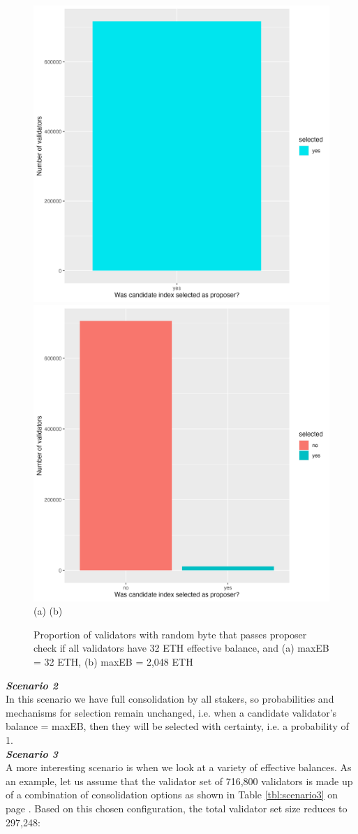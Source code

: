 \begin{figure}[htbp]
\begin{center}
\includegraphics[width=0.45\linewidth]{images/current-solo-barchart}
\includegraphics[width=0.45\linewidth]{images/maxeb-solo-barchart} \\
(a) \hspace{180pt}     (b)
\caption{Proportion of validators with random byte that passes proposer check if all validators have 32 ETH effective balance, and (a) maxEB = 32 ETH, (b) maxEB = 2,048 ETH}
\label{fig:maxebsolo}
\end{center}
\end{figure}

\noindent
\textbf{\textit{Scenario 2}} \\
\noindent
In this scenario we have full consolidation by all stakers, so probabilities and mechanisms for selection remain unchanged, i.e. when a candidate validator's balance = maxEB, then they will be selected with certainty, i.e. a probability of 1. \\

\clearpage
\noindent
\textbf{\textit{Scenario 3}} \\
\noindent
A more interesting scenario is when we look at a variety of effective balances. As an example, let us assume that the validator set of 716,800 validators is made up of a combination of consolidation options as shown in Table \ref{tbl:scenario3} on page \pageref{tbl:scenario3}. Based on this chosen configuration, the total validator set size reduces to 297,248: \\

